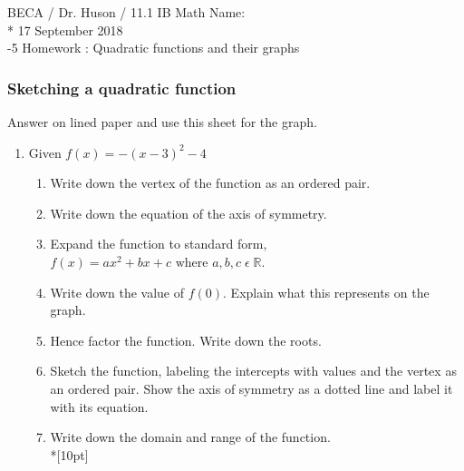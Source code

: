 \documentclass[12pt, oneside]{article}
\begin{document}
\noindent BECA / Dr. Huson / 11.1 IB Math \hspace{2in} Name:\\*
17 September 2018\\ -5 Homework : Quadratic functions and their graphs

\subsubsection*{Sketching a quadratic function}
Answer on lined paper and use this sheet for the graph.

\begin{enumerate}


\item   Given $f(x)=-(x-3)^2-4$
\begin{enumerate}
    \item Write down the vertex of the function as an ordered pair.
    \item Write down the equation of the axis of symmetry.
    \item Expand the function to standard form, $f(x)=ax^2+bx+c \text{ where } a, b, c \;  \epsilon \; \mathbb{R}$.
    \item Write down the value of $f(0)$. Explain what this represents on the graph.
    \item Hence factor the function. Write down the roots.
    \item Sketch the function, labeling the intercepts with values and the vertex as an ordered pair. Show the axis of symmetry as a dotted line and label it with its equation.

    \begin{center} %
    \end{center}


    \item Write down the domain and range of the function.\\*[10pt]
\end{enumerate}


\newpage

\end{enumerate}
\end{document}
